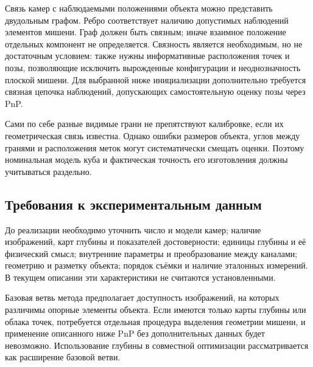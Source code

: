 Связь камер с наблюдаемыми положениями объекта можно представить двудольным графом. Ребро соответствует наличию допустимых наблюдений элементов мишени. Граф должен быть связным; иначе взаимное положение отдельных компонент не определяется. Связность является необходимым, но не достаточным условием: также нужны информативные расположения точек и позы, позволяющие исключить вырожденные конфигурации и неоднозначность плоской мишени. Для выбранной ниже инициализации дополнительно требуется связная цепочка наблюдений, допускающих самостоятельную оценку позы через PnP.

Сами по себе разные видимые грани не препятствуют калибровке, если их геометрическая связь известна. Однако ошибки размеров объекта, углов между гранями и расположения меток могут систематически смещать оценки. Поэтому номинальная модель куба и фактическая точность его изготовления должны учитываться раздельно.

\subsection{Требования к экспериментальным данным}

До реализации необходимо уточнить число и модели камер; наличие изображений, карт глубины и показателей достоверности; единицы глубины и её физический смысл; внутренние параметры и преобразование между каналами; геометрию и разметку объекта; порядок съёмки и наличие эталонных измерений. В текущем описании эти характеристики не считаются установленными.

Базовая ветвь метода предполагает доступность изображений, на которых различимы опорные элементы объекта. Если имеются только карты глубины или облака точек, потребуется отдельная процедура выделения геометрии мишени, и применение описанного ниже PnP без дополнительных данных будет невозможно. Использование глубины в совместной оптимизации рассматривается как расширение базовой ветви.
